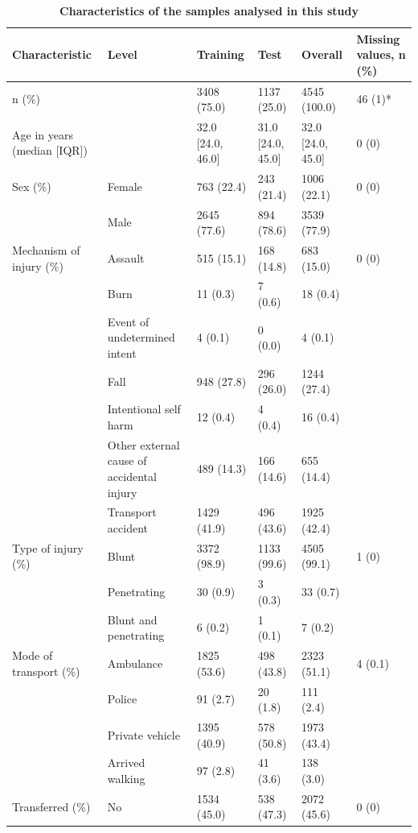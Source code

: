 \documentclass[10pt,letterpaper]{article}\usepackage[]{graphicx}\usepackage[]{color}
\begin{document}
\begin{table}[!ht] 
 \begin{adjustwidth}{-2.25in}{0in}
\centering
\caption{\bf Characteristics of the samples analysed in this study} 
\label{tab:sample-characteristics}
\begin{adjustbox}{max width=\linewidth} 
\begin{tabular} 
{llllll}
  \hline
Characteristic & Level & Training & Test & Overall & Missing values, n (\%) \\ 
  \hline
n (\%) &  & 3408 (75.0) & 1137 (25.0) & 4545 (100.0) & 46 (1)* \\ 
  Age in years (median [IQR]) &  & 32.0 [24.0, 46.0] & 31.0 [24.0, 45.0] & 32.0 [24.0, 45.0] & 0 (0) \\ 
  Sex (\%) & Female & 763 (22.4) & 243 (21.4) & 1006 (22.1) & 0 (0) \\ 
   & Male & 2645 (77.6) & 894 (78.6) & 3539 (77.9) &  \\ 
  Mechanism of injury (\%) & Assault & 515 (15.1) & 168 (14.8) & 683 (15.0) & 0 (0) \\ 
   & Burn & 11 (0.3) & 7 (0.6) & 18 (0.4) &  \\ 
   & Event of undetermined intent & 4 (0.1) & 0 (0.0) & 4 (0.1) &  \\ 
   & Fall & 948 (27.8) & 296 (26.0) & 1244 (27.4) &  \\ 
   & Intentional self harm & 12 (0.4) & 4 (0.4) & 16 (0.4) &  \\ 
   & Other external cause of accidental injury & 489 (14.3) & 166 (14.6) & 655 (14.4) &  \\ 
   & Transport accident & 1429 (41.9) & 496 (43.6) & 1925 (42.4) &  \\ 
  Type of injury (\%) & Blunt & 3372 (98.9) & 1133 (99.6) & 4505 (99.1) & 1 (0) \\ 
   & Penetrating & 30 (0.9) & 3 (0.3) & 33 (0.7) &  \\ 
   & Blunt and penetrating & 6 (0.2) & 1 (0.1) & 7 (0.2) &  \\ 
  Mode of transport (\%) & Ambulance & 1825 (53.6) & 498 (43.8) & 2323 (51.1) & 4 (0.1) \\ 
   & Police & 91 (2.7) & 20 (1.8) & 111 (2.4) &  \\ 
   & Private vehicle & 1395 (40.9) & 578 (50.8) & 1973 (43.4) &  \\ 
   & Arrived walking & 97 (2.8) & 41 (3.6) & 138 (3.0) &  \\ 
  Transferred (\%) & No & 1534 (45.0) & 538 (47.3) & 2072 (45.6) & 0 (0) \\ 

\end{tabular}
\end{adjustbox}
\end{adjustwidth}
\end{table}
\end{document}
